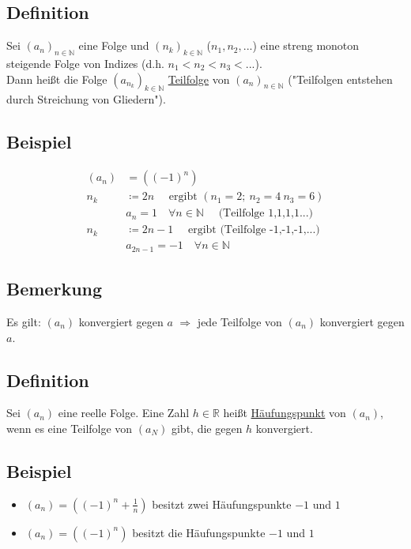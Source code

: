\documentclass[12pt, titlepage]{article}
\newcommand{\R}{\mathds{R}}
\newcommand{\N}{\mathds{N}}
\renewcommand{\>}{\rightarrow}
\renewcommand{\*}{\cdot}
\begin{document}
	\subsection{Definition}
	Sei $(a_n)_{n\in\N}$ eine Folge und $(n_k)_{k\in\N}$ ($n_1,n_2,...$) eine streng monoton steigende Folge von Indizes (d.h. $n_1<n_2<n_3<...$).\\
	Dann heißt die Folge $(a_{n_k})_{k\in\N}$ \underline{Teilfolge} von $(a_n)_{n\in\N}$ ("Teilfolgen entstehen durch Streichung von Gliedern").
	\subsection{Beispiel}
	\begin{align*}
		(a_n)&=((-1)^n)\\
		n_k&\coloneqq 2n\quad\textrm{ ergibt  }(n_1=2;\ n_2=4\ n_3=6)\\
		&a_n=1\quad\forall n\in\N\quad\textrm{ (Teilfolge 1,1,1,1...)}\\
		n_k&\coloneqq 2n-1\quad\textrm{ ergibt (Teilfolge -1,-1,-1,...)}\\
		&a_{2n-1}=-1\quad\forall n\in\N
	\end{align*}
	\subsection{Bemerkung}
	Es gilt: $(a_n)$ konvergiert gegen $a$ $\Rightarrow$ jede Teilfolge von $(a_n)$ konvergiert gegen $a$.
	\subsection{Definition}
	Sei $(a_n)$ eine reelle Folge.
	Eine Zahl $h\in\R$ heißt \underline{Häufungspunkt} von $(a_n)$, wenn es eine Teilfolge von $(a_N)$ gibt, die gegen $h$ konvergiert.
	\subsection{Beispiel}
	\begin{itemize}
		\item $(a_n)=((-1)^n+\frac{1}{n})$ besitzt zwei Häufungspunkte $-1$ und $1$
		\item $(a_n)=((-1)^n)$ besitzt die Häufungspunkte $-1$ und $1$
	\end{itemize}
\end{document}
